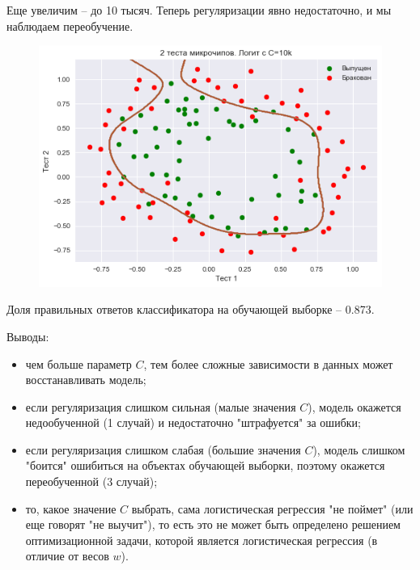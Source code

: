 \documentclass{beamer}
\begin{document}
\begin{frame}[fragile]
Еще увеличим  – до 10 тысяч. Теперь регуляризации явно недостаточно, и мы наблюдаем переобучение.
\begin{figure}[h]
\centering
\includegraphics[scale=0.4]{images/test-06.png}
\end{figure}
Доля правильных ответов классификатора на обучающей выборке – 0.873.
\end{frame}

\begin{frame}[fragile]
Выводы:
\begin{itemize}
\item чем больше параметр $C$, тем более сложные зависимости в данных может восстанавливать модель;
\item если регуляризация слишком сильная (малые значения $C$), модель окажется недообученной (1 случай) и недостаточно "штрафуется" за ошибки;
\item если регуляризация слишком слабая (большие значения $C$), модель слишком "боится" ошибиться на объектах обучающей выборки, поэтому окажется переобученной (3 случай);
\item то, какое значение $C$ выбрать, сама логистическая регрессия "не поймет" (или еще говорят "не выучит"), то есть это не может быть определено решением оптимизационной задачи, которой является логистическая регрессия (в отличие от весов $w$). 
\end{itemize}
\end{frame}
\end{document}

